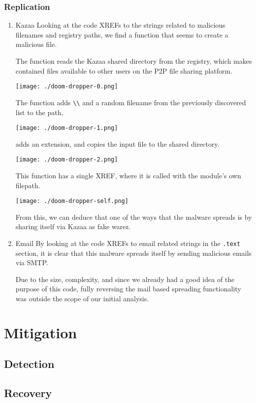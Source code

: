 \documentclass[11pt]{article}
\begin{document}
\subsubsection{Replication}
\label{sec:orgc9fd145}
\begin{enumerate}
\item Kazaa
\label{sec:org4f59287}
Looking at the code XREFs to the strings related to malicious
filenames and registry paths, we find a function that seems to create
a malicious file.

The function reads the Kazaa shared directory from the registry, which
makes contained files available to other users on the P2P file sharing
platform.

\begin{center}
\texttt{[image: ./doom-dropper-0.png]}
\end{center}

The function adds \texttt{\textbackslash{}\textbackslash{}} and a random filename from the previously
discovered list to the path,

\begin{center}
\texttt{[image: ./doom-dropper-1.png]}
\end{center}

adds an extension, and copies the input file to the shared directory.

\begin{center}
\texttt{[image: ./doom-dropper-2.png]}
\end{center}

This function has a single XREF, where it is called with the module's
own filepath.

\begin{center}
\texttt{[image: ./doom-dropper-self.png]}
\end{center}

From this, we can deduce that one of the ways that the malware spreads
is by sharing itself via Kazaa as fake warez.
\item Email
\label{sec:orgb13ef8a}
By looking at the code XREFs to email related strings in the \texttt{.text}
section, it is clear that this malware spreads itself by sending
malicious emails via SMTP.

Due to the size, complexity, and since we already had a good idea of
the purpose of this code, fully reversing the mail based spreading
functionality was outside the scope of our initial analysis.
\end{enumerate}
\section{Mitigation}
\label{sec:org38308ff}
\subsection{Detection}
\label{sec:org11d6cc6}
\subsection{Recovery}
\label{sec:orgaa60d5c}
\end{document}
